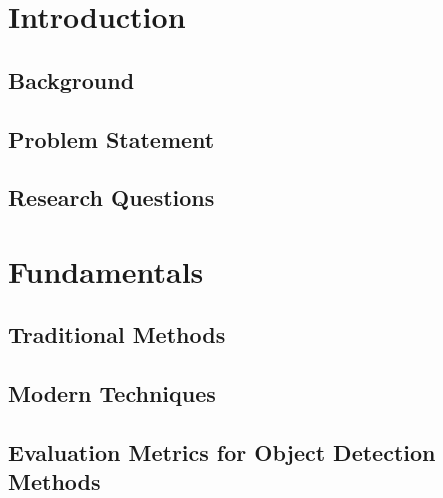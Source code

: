 \chapter{Introduction}
\section{Background}

\section{Problem Statement}


\section{Research Questions}

\chapter{Fundamentals}

\section{Traditional Methods}

\section{Modern Techniques}

\section{Evaluation Metrics for Object Detection Methods}
